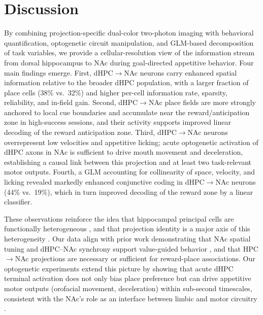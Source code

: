 \documentclass[10pt,a4paper]{article}
\begin{document}
\section{Discussion}
By combining projection-specific dual-color two-photon imaging with behavioral quantification, optogenetic circuit manipulation, and GLM-based decomposition of task variables, we provide a cellular-resolution view of the information stream from dorsal hippocampus to NAc during goal-directed appetitive behavior. Four main findings emerge. First, dHPC$\rightarrow$NAc neurons carry enhanced spatial information relative to the broader dHPC population, with a larger fraction of place cells (38\% vs.\ 32\%) and higher per-cell information rate, sparsity, reliability, and in-field gain. Second, dHPC$\rightarrow$NAc place fields are more strongly anchored to local cue boundaries and accumulate near the reward/anticipation zone in high-success sessions, and their activity supports improved linear decoding of the reward anticipation zone. Third, dHPC$\rightarrow$NAc neurons overrepresent low velocities and appetitive licking; acute optogenetic activation of dHPC axons in NAc is sufficient to drive mouth movement and deceleration, establishing a causal link between this projection and at least two task-relevant motor outputs. Fourth, a GLM accounting for collinearity of space, velocity, and licking revealed markedly enhanced conjunctive coding in dHPC$\rightarrow$NAc neurons (44\% vs.\ 19\%), which in turn improved decoding of the reward zone by a linear classifier.

These observations reinforce the idea that hippocampal principal cells are functionally heterogeneous \cite{soltesz2018neuronal,cembrowski2019heterogeneity}, and that projection identity is a major axis of this heterogeneity \cite{ciocchi2015selective,okuyama2016ventral}. Our data align with prior work demonstrating that NAc spatial tuning and dHPC--NAc synchrony support value-guided behavior \cite{lansink2008preferential,lansink2009hippocampus,tabuchi2000hippocampal}, and that HPC$\rightarrow$NAc projections are necessary \cite{ito2008functional,loureiro2016hippocampal} or sufficient \cite{trouche2019new,legates2018reward} for reward-place associations. Our optogenetic experiments extend this picture by showing that acute dHPC terminal activation does not only bias place preference but can drive appetitive motor outputs (orofacial movement, deceleration) within sub-second timescales, consistent with the NAc's role as an interface between limbic and motor circuitry \cite{mogenson1980motivation,floresco2015nucleus,pennartz2011hippocampal}.
\end{document}
